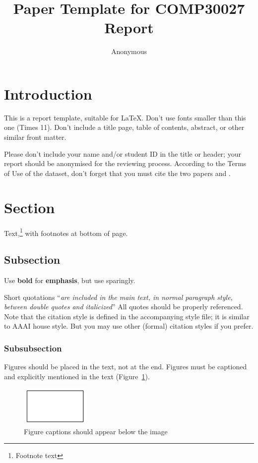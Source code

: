 \documentclass[11pt]{article}
\title{Paper Template for COMP30027 Report}
\author
{Anonymous}
\begin{document}
\maketitle



\section{Introduction}

This is a report template, suitable for \LaTeX. Don't use fonts smaller than this one (Times 11). Don't include a title page,
table of contents, abstract, or other similar front matter.

Please don't include your name and/or student ID in the title or header; your report should be anonymised for the reviewing process. According to the Terms of Use of the dataset, don’t forget that you must cite the two papers \cite{mukherjee2013yelp} and \cite{rayana2015collective}.


\section{Section}

Text,\footnote{Footnote text} with footnotes at bottom of page.


\subsection{Subsection}

Use \textbf{bold} for \textbf{emphasis}, but use sparingly. 

Short quotations ``\textit{are included in the main text, in normal paragraph style, between double quotes and italicized}'' All quotes should be properly referenced. Note that the citation style is defined in the accompanying
style file; it is similar to AAAI house style. But you may use other (formal) citation styles if you prefer.

\subsubsection{Subsubsection}

Figures should be placed in the text, not at the end. Figures must be captioned and explicitly mentioned in the text (Figure~\ref{fig:sample}). 
\begin{figure}[!h]
	\centering
	\includegraphics[width = 0.3\textwidth]{sample-figure.png}
	\caption{Figure captions should appear below the image}
	\label{fig:sample}
\end{figure}
\end{document}
